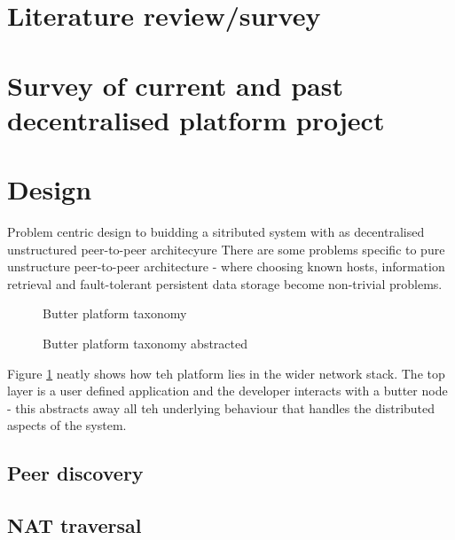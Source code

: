 \documentclass[a4paper]{article}
\begin{document}
\section{Literature review/survey}
\section{Survey of current and past decentralised platform project}

\section{Design}
Problem centric design to buidding a sitributed system with as decentralised unstructured peer-to-peer architecyure
There are some problems specific to pure unstructure peer-to-peer architecture - where choosing known hosts, information retrieval and fault-tolerant persistent data storage become non-trivial problems.

\begin{figure}
    \centering
    
    \caption{Butter platform taxonomy}
    \label{fig:butter-platform-taxonomy}
\end{figure}

\begin{figure}
    \centering
    
    \caption{Butter platform taxonomy abstracted}
    \label{fig:butter-platform-taxonomy-abstracted}
\end{figure}

Figure \ref{fig:butter-platform-taxonomy} neatly shows how teh platform lies in the wider network stack. The top layer is a user defined application and the developer interacts with a butter node - this abstracts away all teh underlying behaviour that handles the distributed aspects of the system.

\subsection{Peer discovery}
\subsection{NAT traversal}
\end{document}
